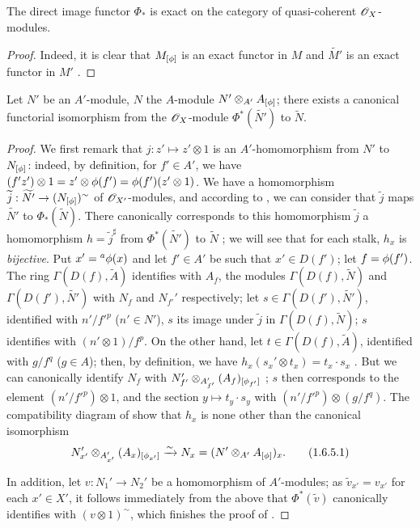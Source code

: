 \begin{cor}[1.6.4]
\label{1.1.6.4}
The direct image functor $\Phi_*$ is exact on the category of quasi-coherent $\mathscr{O}_X$-modules.
\end{cor}

\begin{proof}
\label{proof-1.1.6.4}
Indeed, it is clear that $M_{[\phi]}$ is an exact functor in $M$ and $\widetilde{M'}$ is an
exact functor in $M'$ .
\end{proof}

\begin{prop}[1.6.5]
\label{1.1.6.5}
Let $N'$ be an $A'$-module, $N$ the $A$-module $N'\otimes_{A'}A_{[\phi]}$; there exists a
canonical functorial isomorphism from the $\mathscr{O}_X$-module $\Phi^*(\widetilde{N'})$ to
$\widetilde{N}$.
\end{prop}

\begin{proof}
\label{proof-1.1.6.5}
We first remark that $j:z'\mapsto z'\otimes 1$ is an $A'$-homomorphism from $N'$ to
$N_{[\phi]}$: indeed, by definition, for $f'\in A'$, we have
$(f' z')\otimes 1=z'\otimes\phi(f')=\phi(f')(z'\otimes 1)$. We have  a
homomorphism $\widetilde{j}:\widetilde{N'}\to(N_{[\phi]})^\sim$ of $\mathscr{O}_{X'}$-modules, and
according to , we can consider that $\widetilde{j}$ maps $\widetilde{N'}$
to $\Phi_*(\widetilde{N})$. There canonically corresponds to this homomorphism
$\widetilde{j}$ a homomorphism $h=\widetilde{j}^\sharp$ from $\Phi^*(\widetilde{N'})$ to
$\widetilde{N}$ ; we will see that for each stalk, $h_x$ is {\em bijective}.
Put $x'={}^a\phi(x)$ and let $f'\in A'$ be such that $x'\in D(f')$; let $f=\phi(f')$. The
ring $\Gamma(D(f),\widetilde{A})$ identifies with $A_f$, the modules
$\Gamma(D(f),\widetilde{N})$ and $\Gamma(D(f'),\widetilde{N'})$ with $N_f$ and $N_{f'}'$
respectively; let $s\in\Gamma(D(f'),\widetilde{N'})$, identified with $n'/{f'}^p$
($n'\in N'$), $s$ its image under $\widetilde{j}$ in $\Gamma(D(f),\widetilde{N})$; $s$
identifies with $(n'\otimes 1)/f^p$. On the other hand, let $t\in\Gamma(D(f),\widetilde{A})$,
identified with $g/f^q$ ($g\in A$); then, by definition, we have
$h_x(s_x'\otimes t_x)=t_x\cdot s_x$ . But we can canonically identify $N_f$
with $N_{f'}'\otimes_{A_{f'}'}(A_f)_{[\phi_{f'}]}$ ; $s$ then corresponds
to the element $(n'/{f'}^p)\otimes 1$, and the section $y\mapsto t_y\cdot s_y$ with
$(n'/{f'}^p)\otimes(g/f^q)$. The compatibility diagram of  show that $h_x$
is none other than the canonical isomorphism
\[
  N_{x'}'\otimes_{A_{x'}'}(A_x)_{[\phi_{x'}]}\xrightarrow{\sim} N_x=(N'\otimes_{A'}A_{[\phi]})_x.
  \tag{1.6.5.1}
\]

In addition, let $v:N_1'\to N_2'$ be a homomorphism of $A'$-modules; as
$\widetilde{v}_{x'}=v_{x'}$ for each $x'\in X'$, it follows immediately from the above that
$\Phi^*(\widetilde{v})$ canonically identifies with $(v\otimes 1)^\sim$, which finishes the
proof of .
\end{proof}

